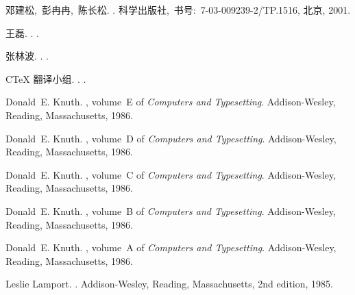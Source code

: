 \begin{thebibliography}{10}

{邓建松,~彭冉冉,~陈长松}.
.
\newblock 科学出版社,~书号:~7-03-009239-2/TP.1516, 北京, 2001.

王磊.
.
.

张林波.
.
.

C\TeX{} 翻译小组.
.
.

Donald~E. Knuth.
, volume~E of {\em Computers and
  Typesetting}.
\newblock Addison-Wesley, Reading, Massachusetts, 1986.

Donald~E. Knuth.
, volume~D of {\em Computers and
  Typesetting}.
\newblock Addison-Wesley, Reading, Massachusetts, 1986.

Donald~E. Knuth.
, volume~C of {\em Computers and
  Typesetting}.
\newblock Addison-Wesley, Reading, Massachusetts, 1986.

Donald~E. Knuth.
, volume~B of {\em Computers and
  Typesetting}.
\newblock Addison-Wesley, Reading, Massachusetts, 1986.

Donald~E. Knuth.
, volume~A of {\em Computers and Typesetting}.
\newblock Addison-Wesley, Reading, Massachusetts, 1986.

Leslie Lamport.
.
\newblock Addison-Wesley, Reading, Massachusetts, 2nd edition, 1985.

\end{thebibliography}
